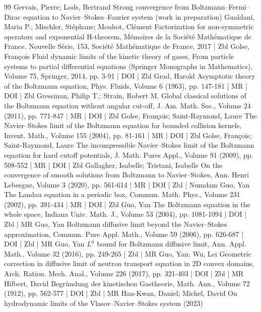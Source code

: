 \documentclass[10pt]{amsart}
\theoremstyle{definition}\newtheorem{defi}[theo]{Definition}\newtheorem{rema}[theo]{Remark}\newtheorem{exam}[theo]{Example}\newtheorem{exem}[theo]{Example}\newtheorem{nota}[theo]{Notation}
\begin{document}
\begin{thebibliography}{99}
 Gervais, Pierre; Lods, Bertrand Strong convergence from Boltzmann–Fermi–Dirac equation to Navier–Stokes–Fourier system (work in preparation)
 Gualdani, Maria P.; Mischler, Stéphane; Mouhot, Clément Factorization for non-symmetric operators and exponential H-theorem, Mémoires de la Société Mathématique de France. Nouvelle Série, 153, Société Mathématique de France, 2017 | Zbl
 Golse, François Fluid dynamic limits of the kinetic theory of gases, From particle systems to partial differential equations (Springer Monographs in Mathematics), Volume 75, Springer, 2014, pp. 3-91 | DOI | Zbl
 Grad, Harold Asymptotic theory of the Boltzmann equation, Phys. Fluids, Volume 6 (1963), pp. 147-181 | MR | DOI | Zbl
 Gressman, Philip T.; Strain, Robert M. Global classical solutions of the Boltzmann equation without angular cut-off, J. Am. Math. Soc., Volume 24 (2011), pp. 771-847 | MR | DOI | Zbl
 Golse, François; Saint-Raymond, Laure The Navier–Stokes limit of the Boltzmann equation for bounded collision kernels, Invent. Math., Volume 155 (2004), pp. 81-161 | MR | DOI | Zbl
 Golse, François; Saint-Raymond, Laure The incompressible Navier–Stokes limit of the Boltzmann equation for hard cutoff potentials, J. Math. Pures Appl., Volume 91 (2009), pp. 508-552 | MR | DOI | Zbl
 Gallagher, Isabelle; Tristani, Isabelle On the convergence of smooth solutions from Boltzmann to Navier–Stokes, Ann. Henri Lebesgue, Volume 3 (2020), pp. 561-614 | MR | DOI | Zbl | Numdam
 Guo, Yan The Landau equation in a periodic box, Commun. Math. Phys., Volume 231 (2002), pp. 391-434 | MR | DOI | Zbl
 Guo, Yan The Boltzmann equation in the whole space, Indiana Univ. Math. J., Volume 53 (2004), pp. 1081-1094 | DOI | Zbl | MR
 Guo, Yan Boltzmann diffusive limit beyond the Navier–Stokes approximation, Commun. Pure Appl. Math., Volume 59 (2006), pp. 626-687 | DOI | Zbl | MR
 Guo, Yan ${L}^{6}$ bound for Boltzmann diffusive limit, Ann. Appl. Math., Volume 32 (2016), pp. 249-265 | Zbl | MR
 Guo, Yan; Wu, Lei Geometric correction in diffusive limit of neutron transport equation in 2D convex domains, Arch. Ration. Mech. Anal., Volume 226 (2017), pp. 321-403 | DOI | Zbl | MR
 Hilbert, David Begründung der kinetischen Gastheorie, Math. Ann., Volume 72 (1912), pp. 562-577 | DOI | Zbl | MR
 Han-Kwan, Daniel; Michel, David On hydrodynamic limits of the Vlasov–Navier–Stokes system (2023)

\end{thebibliography}
\end{document}
